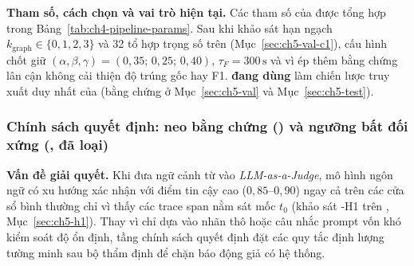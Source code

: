 \textbf{Tham số, cách chọn và vai trò hiện tại.} Các tham số của  được tổng hợp trong Bảng~\ref{tab:ch4-pipeline-params}. Sau khi khảo sát hạn ngạch $k_{\text{graph}} \in \{0, 1, 2, 3\}$ và 32 tổ hợp trọng số trên  (Mục~\ref{sec:ch5-val-c1}), cấu hình chốt giữ $(\alpha, \beta, \gamma) = (0{,}35;\, 0{,}25;\, 0{,}40)$, $\tau_F = 300\,\text{s}$ và  vì ép thêm bằng chứng lân cận không cải thiện độ trúng gốc hay F1. \textbf{ đang dùng} làm chiến lược truy xuất duy nhất của \CTAV{} (bằng chứng ở Mục~\ref{sec:ch5-val} và Mục~\ref{sec:ch5-test}).

\subsubsection{Chính sách quyết định: neo bằng chứng () và ngưỡng bất đối xứng (, đã loại)}
\label{sec:ch4-policy}

\textbf{Vấn đề giải quyết.} Khi đưa ngữ cảnh từ  vào \emph{LLM-as-a-Judge}, mô hình ngôn ngữ có xu hướng xác nhận  với điểm tin cậy cao ($0{,}85$--$0{,}90$) ngay cả trên các cửa sổ bình thường chỉ vì thấy các trace span nằm sát mốc $t_0$ (khảo sát \hyp{H1} trên , Mục~\ref{sec:ch5-h1}). Thay vì chỉ dựa vào nhãn thô hoặc câu nhắc prompt vốn khó kiểm soát độ ổn định, tầng chính sách quyết định đặt các quy tắc định lượng tường minh sau bộ thẩm định để chặn báo động giả có hệ thống.

